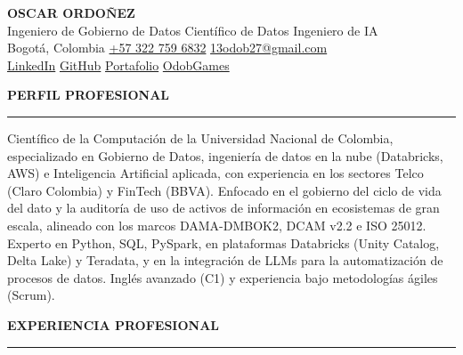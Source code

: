 \documentclass[letterpaper,10pt]{article}
\newcommand{\sizeName}   {\fontsize{20}{23}\selectfont}
\newcommand{\sizeTitle}  {\fontsize{10.6}{12.7}\selectfont}
\newcommand{\sizeContact}{\fontsize{9}{11}\selectfont}
\newcommand{\sizeSection}{\fontsize{11.5}{13.8}\selectfont}
\newcommand{\sizeBody}   {\fontsize{10}{12.2}\selectfont}
\newcommand{\md}{\,\textperiodcentered\,}                  %
\newcommand{\sepdot}{\hspace{4pt}\textbullet\hspace{4pt}}   %
\newcommand{\cvsection}[1]{%
  \needspace{3\baselineskip}%
  \vspace{13pt}%
  {\color{cvblue}\sizeSection\bfseries #1}\par
  \vspace{-5pt}%
  {\color{cvblue}\rule{\textwidth}{0.7pt}}\par
  \vspace{3pt}%
}
\begin{document}
\sizeBody

{\centering
  {\color{cvdark}\sizeName\bfseries OSCAR ORDOÑEZ}\\[3pt]
  {\color{cvblue}\sizeTitle Ingeniero de Gobierno de Datos\md Científico de Datos\md Ingeniero de IA}\\[1pt]
  {\color{cvgray}\sizeContact
    Bogotá, Colombia\sepdot
    \href{tel:+573227596832}{+57 322 759 6832}\sepdot
    \href{mailto:13odob27@gmail.com}{13odob27@gmail.com}}\\[0pt]
  {\color{cvgray}\sizeContact
    \href{https://www.linkedin.com/in/oscarordonez13}{LinkedIn}\sepdot
    \href{https://github.com/OdobGames}{GitHub}\sepdot
    \href{https://odobgames.github.io/Portafolio/}{Portafolio}\sepdot
    \href{https://odobgames.github.io/OdobGames}{OdobGames}}\par}
\vspace{0pt}

\cvsection{PERFIL PROFESIONAL}

Científico de la Computación de la Universidad Nacional de Colombia,
especializado en Gobierno de Datos, ingeniería de datos en la nube (Databricks,
AWS) e Inteligencia Artificial aplicada, con experiencia en los sectores Telco
(Claro Colombia) y FinTech (BBVA). Enfocado en el gobierno del ciclo de vida del
dato y la auditoría de uso de activos de información en ecosistemas de gran
escala, alineado con los marcos DAMA-DMBOK2, DCAM v2.2 e ISO 25012. Experto en
Python, SQL, PySpark, en plataformas Databricks (Unity Catalog, Delta Lake) y
Teradata, y en la integración de LLMs para la automatización de procesos de
datos. Inglés avanzado (C1) y experiencia bajo metodologías ágiles (Scrum).

\cvsection{EXPERIENCIA PROFESIONAL}
\end{document}
